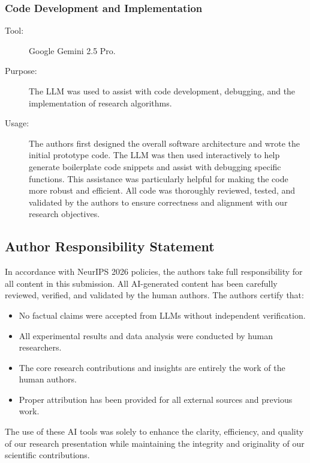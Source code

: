 \subsubsection{Code Development and Implementation}
\label{app:llm:code}
\begin{description}
	\item[Tool:] Google Gemini 2.5 Pro.
	\item[Purpose:] The LLM was used to assist with code development, debugging, and the implementation of research algorithms.
	\item[Usage:] The authors first designed the overall software architecture and wrote the initial prototype code.
	The LLM was then used interactively to help generate boilerplate code snippets and assist with debugging specific functions.
	This assistance was particularly helpful for making the code more robust and efficient.
	All code was thoroughly reviewed, tested, and validated by the authors to ensure correctness and alignment with our research objectives.
\end{description}

\subsection{Author Responsibility Statement}
\label{app:llm:responsibility}
In accordance with NeurIPS 2026 policies, the authors take full responsibility for all content in this submission.
All AI-generated content has been carefully reviewed, verified, and validated by the human authors.
The authors certify that:
\begin{itemize}
	\item No factual claims were accepted from LLMs without independent verification.
	\item All experimental results and data analysis were conducted by human researchers.
	\item The core research contributions and insights are entirely the work of the human authors.
	\item Proper attribution has been provided for all external sources and previous work.
\end{itemize}
The use of these AI tools was solely to enhance the clarity, efficiency, and quality of our research presentation while maintaining the integrity and originality of our scientific contributions.
